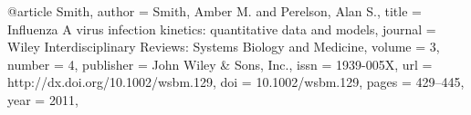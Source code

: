 
@article {Smith,
author = {Smith, Amber M. and Perelson, Alan S.},
title = {Influenza A virus infection kinetics: quantitative data and models},
journal = {Wiley Interdisciplinary Reviews: Systems Biology and Medicine},
volume = {3},
number = {4},
publisher = {John Wiley & Sons, Inc.},
issn = {1939-005X},
url = {http://dx.doi.org/10.1002/wsbm.129},
doi = {10.1002/wsbm.129},
pages = {429--445},
year = {2011},
}